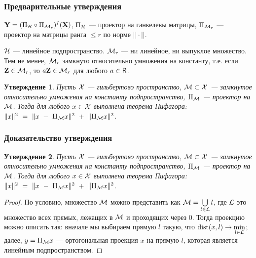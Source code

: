 \documentclass[unicode, notheorems]{beamer}
\newtheorem{proposition}{Утверждение}
\def\dist{\mathop{\mathrm{dist}}}
\begin{document}
\begin{frame}
	\frametitle{Предварительные утверждения}
	$\mathbf{Y} = (\Pi_{\mathcal{H}} \circ \Pi_{\mathcal{M}_r})^I (\mathbf{X})$, $\Pi_{\mathcal{H}}$ --- проектор на ганкелевы матрицы, $\Pi_{\mathcal{M}_r}$ --- проектор на матрицы ранга $\le r$ по норме $||\cdot||$.
	
    \vspace{0.3cm}
	$\mathcal{H}$ --- линейное подпространство. $\mathcal{M}_r$ --- ни линейное, ни выпуклое множество. Тем не менее, $\mathcal{M}_r$ замкнуто относительно умножения на константу, т.е. если $\mathbf{Z} \in \mathcal{M}_r$, то $a \mathbf{Z} \in \mathcal{M}_r$ для любого $a \in \mathsf{R}$.
	\begin{proposition}
		Пусть $\mathcal{X}$ --- гильбертово пространство, $\mathcal{M} \subset \mathcal{X}$ --- замкнутое относительно умножения на константу подпространство, $\Pi_{\mathcal{M}}$ --- проектор на $\mathcal{M}$. Тогда для любого $x \in \mathcal{X}$ выполнена теорема Пифагора: $\|x\|^2~=~\|x~-~\Pi_{\mathcal{M}} x\|^2~+~\|\Pi_{\mathcal{M}} x\|^2$.
	\end{proposition}
\end{frame}

\begin{frame}
	\frametitle{Доказательство утверждения}
	\begin{proposition}
		Пусть $\mathcal{X}$ --- гильбертово пространство, $\mathcal{M} \subset \mathcal{X}$ --- замкнутое относительно умножения на константу подпространство, $\Pi_{\mathcal{M}}$ --- проектор на $\mathcal{M}$. Тогда для любого $x \in \mathcal{X}$ выполнена теорема Пифагора: $\|x\|^2~=~\|x~-~\Pi_{\mathcal{M}} x\|^2~+~\|\Pi_{\mathcal{M}} x\|^2$.
	\end{proposition}
	
	\begin{proof}
	По условию, множество $\mathcal{M}$ можно представить как $\mathcal{M} = \bigcup\limits_{l \in \mathcal{L}}l$, где $\mathcal{L}$ это множество всех прямых, лежащих в $\mathcal{M}$ и проходящих через $0$. Тогда проекцию можно описать так: вначале мы выбираем прямую $l$ такую, что $\dist(x, l) \rightarrow \min\limits_{l \in \calL}$; далее, $y = \Pi_{\mathcal{M}} x$ --- ортогональная проекция $x$ на прямую $l$, которая является линейным подпространством.
	\end{proof}	
\end{frame}
\end{document}
